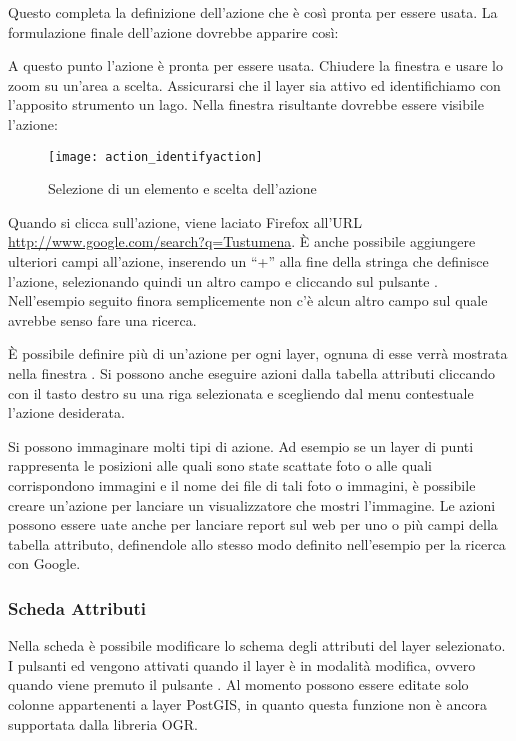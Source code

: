 Questo completa la definizione dell'azione che è così pronta per essere usata.
La formulazione finale dell'azione dovrebbe apparire così:

\begin{center}
\end{center}

A questo punto l'azione è pronta per essere usata. Chiudere la finestra
 e usare lo zoom su un'area a scelta. Assicurarsi
che il layer  sia attivo ed identifichiamo con l'apposito
strumento un lago. Nella finestra risultante dovrebbe essere visibile l'azione:

\begin{figure}[H]
   \begin{center}
   \caption{Selezione di un elemento e scelta dell'azione \nixcaption}\label{fig:identify_action}\smallskip
   \texttt{[image: action\_identifyaction]} 
\end{center}  
\end{figure}

Quando si clicca sull'azione, viene laciato Firefox all'URL
\url{http://www.google.com/search?q=Tustumena}. È anche possibile aggiungere
ulteriori campi all'azione, inserendo un ``+'' alla fine della stringa che
definisce l'azione, selezionando quindi un altro campo e cliccando sul
pulsante . Nell'esempio seguito finora semplicemente non c'è alcun
altro campo sul quale avrebbe senso fare una ricerca.

È possibile definire più di un'azione per ogni layer, ognuna di esse verrà
mostrata nella finestra . Si possono anche
eseguire azioni dalla tabella attributi cliccando con il tasto destro su una
riga selezionata e scegliendo dal menu contestuale l'azione desiderata.

Si possono immaginare molti tipi di azione. Ad esempio se un layer di punti
rappresenta le posizioni alle quali sono state scattate foto o alle quali
corrispondono immagini e il nome dei file di tali foto o immagini, è possibile
creare un'azione per lanciare un visualizzatore che mostri l'immagine. Le
azioni possono essere uate anche per lanciare report sul web per uno o più
campi della tabella attributo, definendole allo stesso modo definito
nell'esempio per la ricerca con Google.

\subsubsection{Scheda Attributi}\label{label_attributes}
Nella scheda  è possibile modificare lo schema degli
attributi del layer selezionato. I pulsanti  ed
 vengono attivati quando il layer è in modalità
modifica, ovvero quando viene premuto il pulsante  . Al momento possono essere editate solo colonne appartenenti a layer
PostGIS, in quanto questa funzione non è ancora supportata dalla libreria OGR. 

